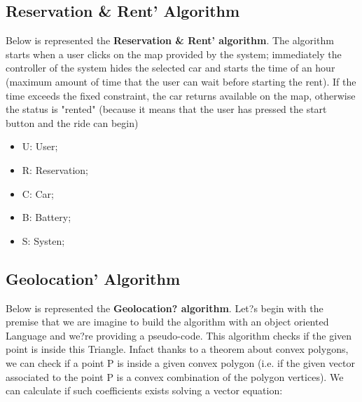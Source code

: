 \subsection{Reservation & Rent' Algorithm}
Below is represented the \textbf{Reservation & Rent' algorithm}. The algorithm starts when a user clicks on the map provided by the system; immediately the controller of the system hides the selected car and starts the time of an hour (maximum amount of time that the user can wait before starting the rent). If the time exceeds the fixed constraint, the car returns available on the map, otherwise the status is "rented" (because it means that the user has pressed the start button and the ride can begin)
\ \\
[Legend]
\begin{itemize}
	\item U: User;
	\item R: Reservation;
	\item C:  Car;
	\item B: Battery;
	\item S: Systen;
\end{itemize}


\newpage
\subsection{Geolocation' Algorithm}
Below is represented the \textbf{Geolocation? algorithm}. Let?s begin with the premise that we are imagine to build the algorithm with an object oriented Language and we?re providing a pseudo-code. This algorithm checks if the given point is inside this Triangle. Infact thanks to a theorem about convex polygons, we can check if a point P is inside a given convex polygon (i.e. if the given vector associated to the point P is a convex combination of the polygon vertices). We can calculate if such coefficients exists solving a vector equation:

